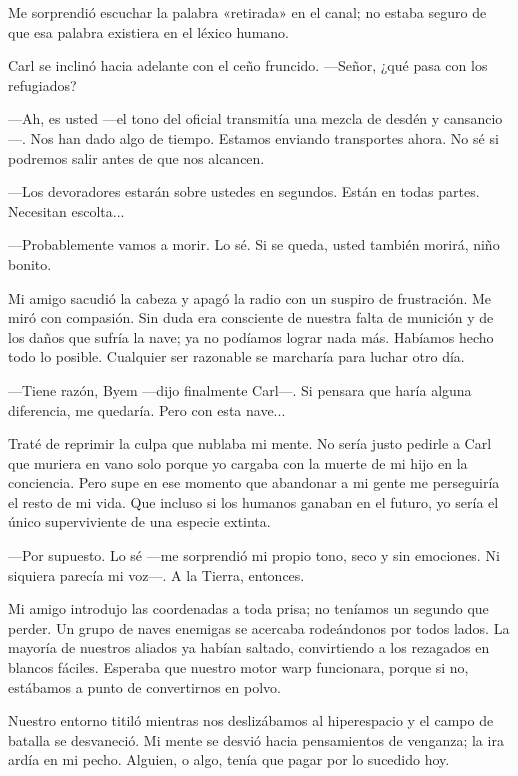 Me sorprendió escuchar la palabra «retirada» en el canal; no estaba seguro de que esa palabra existiera en el léxico humano.

Carl se inclinó hacia adelante con el ceño fruncido. —Señor, ¿qué pasa con los refugiados?

—Ah, es usted —el tono del oficial transmitía una mezcla de desdén y cansancio—. Nos han dado algo de tiempo. Estamos enviando transportes ahora. No sé si podremos salir antes de que nos alcancen.

—Los devoradores estarán sobre ustedes en segundos. Están en todas partes. Necesitan escolta...

—Probablemente vamos a morir. Lo sé. Si se queda, usted también morirá, niño bonito.

Mi amigo sacudió la cabeza y apagó la radio con un suspiro de frustración. Me miró con compasión. Sin duda era consciente de nuestra falta de munición y de los daños que sufría la nave; ya no podíamos lograr nada más. Habíamos hecho todo lo posible. Cualquier ser razonable se marcharía para luchar otro día.

—Tiene razón, Byem —dijo finalmente Carl—. Si pensara que haría alguna diferencia, me quedaría. Pero con esta nave...

Traté de reprimir la culpa que nublaba mi mente. No sería justo pedirle a Carl que muriera en vano solo porque yo cargaba con la muerte de mi hijo en la conciencia. Pero supe en ese momento que abandonar a mi gente me perseguiría el resto de mi vida. Que incluso si los humanos ganaban en el futuro, yo sería el único superviviente de una especie extinta.

—Por supuesto. Lo sé —me sorprendió mi propio tono, seco y sin emociones. Ni siquiera parecía mi voz—. A la Tierra, entonces.

Mi amigo introdujo las coordenadas a toda prisa; no teníamos un segundo que perder. Un grupo de naves enemigas se acercaba rodeándonos por todos lados. La mayoría de nuestros aliados ya habían saltado, convirtiendo a los rezagados en blancos fáciles. Esperaba que nuestro motor warp funcionara, porque si no, estábamos a punto de convertirnos en polvo.

Nuestro entorno titiló mientras nos deslizábamos al hiperespacio y el campo de batalla se desvaneció. Mi mente se desvió hacia pensamientos de venganza; la ira ardía en mi pecho. Alguien, o algo, tenía que pagar por lo sucedido hoy.